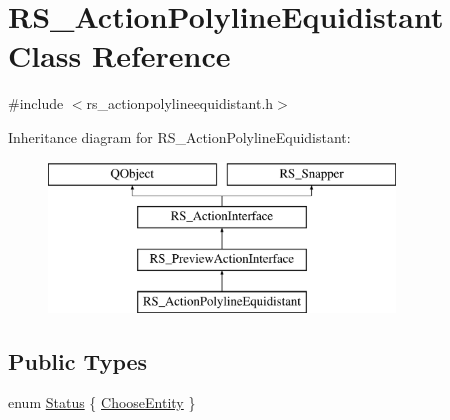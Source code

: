 \hypertarget{classRS__ActionPolylineEquidistant}{\section{R\-S\-\_\-\-Action\-Polyline\-Equidistant Class Reference}
\label{classRS__ActionPolylineEquidistant}
}


{\ttfamily \#include $<$rs\-\_\-actionpolylineequidistant.\-h$>$}

Inheritance diagram for R\-S\-\_\-\-Action\-Polyline\-Equidistant\-:\begin{figure}[H]
\begin{center}
\leavevmode
\includegraphics[height=4.000000cm]{classRS__ActionPolylineEquidistant}
\end{center}
\end{figure}
\subsection*{Public Types}
\begin{DoxyCompactItemize}
\item 
enum \hyperlink{classRS__ActionPolylineEquidistant_a1551cba8ea68141005b443cdbbbd8003}{Status} \{ \hyperlink{classRS__ActionPolylineEquidistant_a1551cba8ea68141005b443cdbbbd8003aaf2e0dcb70c9f6815b61583d4174d890}{Choose\-Entity}
 \}
\end{DoxyCompactItemize}
